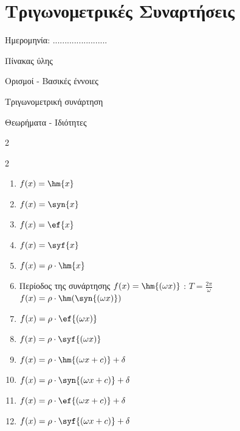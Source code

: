 \documentclass[twoside,nofonts,internet,math,spyros]{frontisthrio}
\newcommand{\myitem}{\stepcounter{enumi}\item[\raisebox{0.5mm}{\faEdit}\ \Large$\square$]}
\begin{document}
\section{Τριγωνομετρικές Συναρτήσεις}
\begin{flushright}
\faCalendar* Ημερομηνία: .......................
\end{flushright}
\begin{mybox}[mysubtitle]{Πίνακας ύλης}
\begin{tcbraster}[raster columns=2,raster equal height]
\begin{myleftbox}{Ορισμοί - Βασικές έννοιες\ \ \faBook}
\begin{arithmisi}[itemsep=0mm]
\item Τριγωνομετρική συνάρτηση
\end{arithmisi}
\end{myleftbox}
\begin{myrightbox}{Θεωρήματα - Ιδιότητες\ \ \faTools}
\begin{arithmisi}[itemsep=0mm]
\item 
\end{arithmisi}
\end{myrightbox}
\end{tcbraster}
\begin{multicols}{2}
\begin{todolist}[itemsep=0mm]
\myitem 
\end{todolist}
\end{multicols}
\begin{multicols}{2}
\begin{enumerate}[itemsep=0mm]
\item $ f(x)=\hm{x} $
\item $ f(x)=\syn{x} $
\item $ f(x)=\ef{x} $
\item $ f(x)=\syf{x} $
\item $ f(x)=\rho\cdot\hm{x} $
\item Περίοδος της συνάρτησης $ f(x)=\hm{(\omega x)} $ : $ T=\frac{2\pi}{\omega} $
$f(x)=\rho\cdot\hm(\syn{(\omega x)})$
\item $f(x)=\rho\cdot\ef{(\omega x)}$
\item $f(x)=\rho\cdot\syf{(\omega x)}$
\item $f(x)=\rho\cdot\hm{(\omega x+c)}+\delta$
\item $f(x)=\rho\cdot\syn{(\omega x+c)}+\delta$
\item $f(x)=\rho\cdot\ef{(\omega x+c)}+\delta$
\item $f(x)=\rho\cdot\syf{(\omega x+c)}+\delta$
\end{enumerate}
\end{multicols}
\end{mybox}
\end{document}
